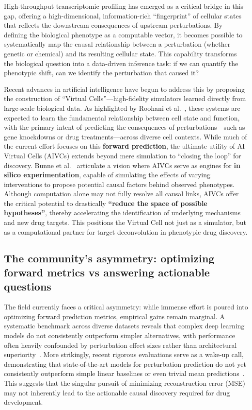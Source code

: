 \documentclass{article}
\begin{document}
High-throughput transcriptomic profiling has emerged as a critical bridge in this gap, offering a high-dimensional, information-rich ``fingerprint'' of cellular states that reflects the downstream consequences of upstream perturbations. By defining the biological phenotype as a computable vector, it becomes possible to systematically map the causal relationship between a perturbation (whether genetic or chemical) and its resulting cellular state. This capability transforms the biological question into a data-driven inference task: if we can quantify the phenotypic shift, can we identify the perturbation that caused it?

Recent advances in artificial intelligence have begun to address this by proposing the construction of ``Virtual Cells''—high-fidelity simulators learned directly from large-scale biological data. As highlighted by Roohani et al.~\cite{roohani_virtual_2025}, these systems are expected to learn the fundamental relationship between cell state and function, with the primary intent of predicting the consequences of perturbations—such as gene knockdowns or drug treatments—across diverse cell contexts. While much of the current effort focuses on this \textbf{forward prediction}, the ultimate utility of AI Virtual Cells (AIVCs) extends beyond mere simulation to ``closing the loop'' for discovery. Bunne et al.~\cite{bunne_how_2024} articulate a vision where AIVCs serve as engines for \textbf{in silico experimentation}, capable of simulating the effects of varying interventions to propose potential causal factors behind observed phenotypes. Although computation alone may not fully resolve all causal links, AIVCs offer the critical potential to drastically \textbf{``reduce the space of possible hypotheses''}, thereby accelerating the identification of underlying mechanisms and new drug targets. This positions the Virtual Cell not just as a simulator, but as a computational partner for target deconvolution in phenotypic drug discovery.


\subsection{The community’s asymmetry: optimizing forward metrics vs answering actionable questions}

The field currently faces a critical asymmetry: while immense effort is poured into optimizing forward prediction metrics, empirical gains remain marginal. A systematic benchmark across diverse datasets reveals that complex deep learning models do not consistently outperform simpler alternatives, with performance often heavily confounded by perturbation effect sizes rather than architectural superiority~\cite{li_systematic_2024}. More strikingly, recent rigorous evaluations serve as a wake-up call, demonstrating that state-of-the-art models for perturbation prediction do not yet consistently outperform simple linear baselines or even trivial mean predictions~\cite{ahlmann-eltze_deep-learning-based_nodate}. This suggests that the singular pursuit of minimizing reconstruction error (MSE) may not inherently lead to the actionable causal discovery required for drug development.
\end{document}
